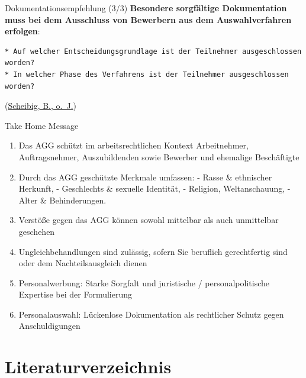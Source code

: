 \documentclass[
  10pt,
  ngerman,
  ignorenonframetext,
]{beamer}
\providecommand{\tightlist}{%
  \setlength{\itemsep}{0pt}\setlength{\parskip}{0pt}}
\begin{document}
\begin{frame}[fragile]{Dokumentationsempfehlung (3/3)}
\protect\hypertarget{dokumentationsempfehlung-33}{}
\textbf{Besondere sorgfältige Dokumentation muss bei dem Ausschluss von
Bewerbern aus dem Auswahlverfahren erfolgen}:

\begin{verbatim}
* Auf welcher Entscheidungsgrundlage ist der Teilnehmer ausgeschlossen worden?
* In welcher Phase des Verfahrens ist der Teilnehmer ausgeschlossen worden?
\end{verbatim}

(\protect\hyperlink{ref-ihk_wsb}{Scheibig, B., o.~J.})
\end{frame}

\begin{frame}{Take Home Message}
\protect\hypertarget{take-home-message}{}
\begin{enumerate}
\tightlist
\item
  Das AGG schützt im arbeitsrechtlichen Kontext Arbeitnehmer,
  Auftragsnehmer, Auszubildenden sowie Bewerber und ehemalige
  Beschäftigte
\item
  Durch das AGG geschützte Merkmale umfassen: - Rasse \& ethnischer
  Herkunft, - Geschlechts \& sexuelle Identität, - Religion,
  Weltanschauung, - Alter \& Behinderungen.
\item
  Verstöße gegen das AGG können sowohl mittelbar als auch unmittelbar
  geschehen
\item
  Ungleichbehandlungen sind zulässig, sofern Sie beruflich gerechtfertig
  sind oder dem Nachteilsausgleich dienen
\item
  Personalwerbung: Starke Sorgfalt und juristische / personalpolitische
  Expertise bei der Formulierung
\item
  Personalauswahl: Lückenlose Dokumentation als rechtlicher Schutz gegen
  Anschuldigungen
\end{enumerate}
\end{frame}

\hypertarget{literaturverzeichnis}{%
\section*{Literaturverzeichnis}\label{literaturverzeichnis}}
\end{document}
